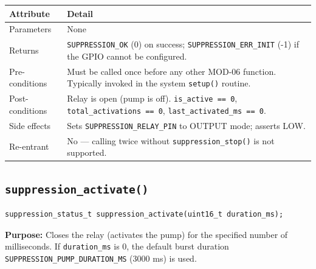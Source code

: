 \documentclass[12pt]{article}
\begin{document}
\begin{table}[H]
\centering\small
\begin{tabularx}{\textwidth}{L{3.5cm} X}
\toprule
\textbf{Attribute} & \textbf{Detail} \\
\midrule
Parameters & None \\
Returns & \texttt{SUPPRESSION\_OK} (0) on success; \texttt{SUPPRESSION\_ERR\_INIT} (-1) if the GPIO cannot be configured. \\
Pre-conditions & Must be called once before any other MOD-06 function. Typically invoked in the system \texttt{setup()} routine. \\
Post-conditions & Relay is open (pump is off). \texttt{is\_active == 0}, \texttt{total\_activations == 0}, \texttt{last\_activated\_ms == 0}. \\
Side effects & Sets \texttt{SUPPRESSION\_RELAY\_PIN} to OUTPUT mode; asserts LOW. \\
Re-entrant & No --- calling twice without \texttt{suppression\_stop()} is not supported. \\
\bottomrule
\end{tabularx}
\end{table}

\subsection{\texttt{suppression\_activate()}}

\begin{lstlisting}[style=cstyle, numbers=none]
suppression_status_t suppression_activate(uint16_t duration_ms);
\end{lstlisting}

\textbf{Purpose:} Closes the relay (activates the pump) for the specified number of milliseconds. If \texttt{duration\_ms} is 0, the default burst duration \texttt{SUPPRESSION\_PUMP\_DURATION\_MS} (3000 ms) is used.
\end{document}
